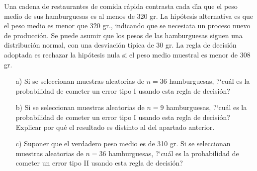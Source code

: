 \begin{prob}%
    Una cadena de restaurantes de comida r\'apida contrasta cada
    d\'{\i}a que el peso medio de sus hamburguesas es al menos de 320
    gr. La hip\'otesis alternativa es que el peso medio es menor que
    320 gr., indicando que se necesiata un proceso nuevo de
    producci\'on. Se puede asumir que los pesos de las hamburguesas
    siguen una distribuci\'on normal, con una desviaci\'on t\'{i}pica
    de 30 gr. La regla de decisi\'on adoptada es rechazar la
    hip\'otesis nula si el peso medio muestral es menor de 308 gr.
    \begin{itemize}
        \item  [a)] Si se seleccionan muestras aleatorias de $n = 36$
        hamburguesas, ?`cu\'al es la probabilidad de cometer un error
        tipo I usando esta regla de decisi\'on?

        \item  [b)] Si se seleccionan muestras aleatorias de $n = 9$
        hamburguesas, ?`cu\'al es la probabilidad de cometer un error
        tipo I usando esta regla de decisi\'on? Explicar por qu\'e el
        resultado es distinto al del apartado anterior.

        \item  [c)] Suponer que el verdadero peso medio es de 310 gr.
    Si se seleccionan muestras aleatorias de $n = 36$
        hamburguesas, ?`cu\'al es la probabilidad de cometer un error
        tipo II usando esta regla de decisi\'on?
    \end{itemize}
\end{prob}

